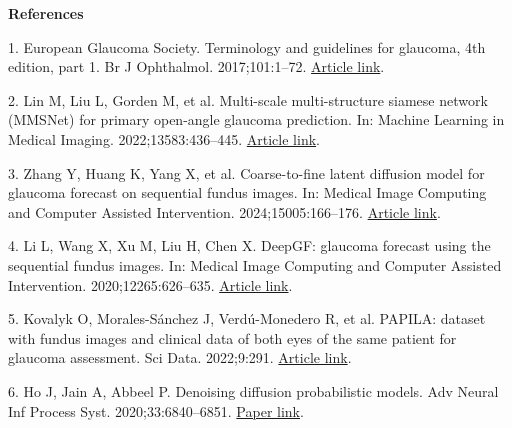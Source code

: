 \documentclass[10pt,letterpaper]{article}
\begin{document}
\vspace{3pt}
{\centering\textbf{References}\par}\vspace{2pt}
\begingroup\footnotesize\raggedright\setlength{\parskip}{1pt}
1. European Glaucoma Society. Terminology and guidelines for glaucoma, 4th edition, part 1. Br J Ophthalmol. 2017;101:1--72. \href{https://doi.org/10.1136/bjophthalmol-2016-EGSguideline.001}{Article link}.

2. Lin M, Liu L, Gorden M, et al. Multi-scale multi-structure siamese network (MMSNet) for primary open-angle glaucoma prediction. In: Machine Learning in Medical Imaging. 2022;13583:436--445. \href{https://doi.org/10.1007/978-3-031-21014-3_45}{Article link}.

3. Zhang Y, Huang K, Yang X, et al. Coarse-to-fine latent diffusion model for glaucoma forecast on sequential fundus images. In: Medical Image Computing and Computer Assisted Intervention. 2024;15005:166--176. \href{https://doi.org/10.1007/978-3-031-72086-4_16}{Article link}.

4. Li L, Wang X, Xu M, Liu H, Chen X. DeepGF: glaucoma forecast using the sequential fundus images. In: Medical Image Computing and Computer Assisted Intervention. 2020;12265:626--635. \href{https://doi.org/10.1007/978-3-030-59722-1_60}{Article link}.

5. Kovalyk O, Morales-S\'{a}nchez J, Verd\'{u}-Monedero R, et al. PAPILA: dataset with fundus images and clinical data of both eyes of the same patient for glaucoma assessment. Sci Data. 2022;9:291. \href{https://doi.org/10.1038/s41597-022-01388-1}{Article link}.

6. Ho J, Jain A, Abbeel P. Denoising diffusion probabilistic models. Adv Neural Inf Process Syst. 2020;33:6840--6851. \href{https://proceedings.neurips.cc/paper/2020/hash/4c5bcfec8584af0d967f1ab10179ca4b-Abstract.html}{Paper link}.
\endgroup
\end{document}
